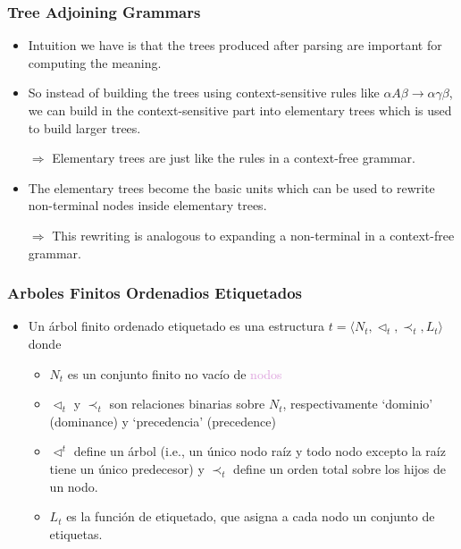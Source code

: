 \documentclass[compress,color=usenames]{beamer}
\newcommand{\mH}[1]{\textcolor{Plum}{#1}}
\newcommand{\tup}[1]{\langle #1 \rangle}
\begin{document}
\begin{frame}
\frametitle{Tree Adjoining Grammars}

\begin{itemize}

\item Intuition we have is that the trees produced after parsing are important for
computing the meaning.

\item So instead of building the trees using context-sensitive rules like
$\alpha A \beta  \rightarrow \alpha \gamma \beta$, we can build in the context-sensitive part into elementary
trees which is used to build larger trees.


$\Rightarrow$ Elementary trees are just like the rules in a context-free grammar.


\item The elementary trees become the basic units which can be used to
rewrite non-terminal nodes inside elementary trees.

$\Rightarrow$ This rewriting is analogous to expanding a non-terminal in a
context-free grammar.

\end{itemize}

\end{frame}

\begin{frame}
\frametitle{Arboles Finitos Ordenadios Etiquetados}

\begin{itemize}
\item Un \'arbol finito ordenado etiquetado es una estructura $t = \tup{N_t, \triangleleft_t, \prec_t, L_t}$ donde

\begin{itemize}
\item $N_t$ es un conjunto finito no vac\'io de \mH{nodos}

\item $\triangleleft_t$ y $\prec_t$ son relaciones binarias sobre $N_t$, respectivamente `dominio' (dominance) y `precedencia' (precedence)

\item $\triangleleft^t$ define un \'arbol (i.e., un \'unico nodo ra\'iz y todo nodo excepto la ra\'iz tiene un \'unico predecesor) y $\prec_t$ define un orden total sobre los hijos de un nodo. 

\item $L_t$ es la funci\'on de etiquetado, que asigna a cada nodo un conjunto de etiquetas.  
\end{itemize}
\end{itemize}
\end{frame}
\end{document}
